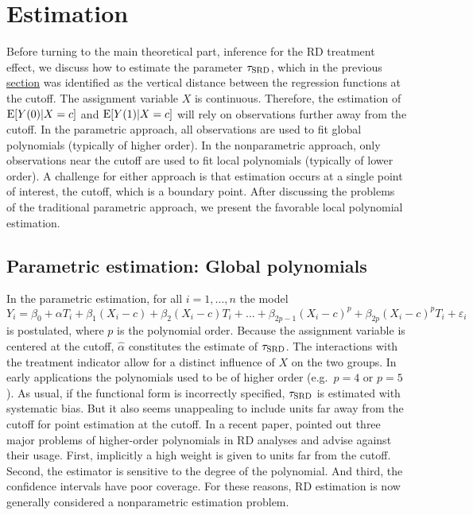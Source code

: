 


\section{Estimation} \label{sec:estimation}

Before turning to the main theoretical part, inference for the RD treatment effect, we discuss how to estimate the parameter $\tau_{\textup{SRD}}$,
which in the previous \hyperref[sec:identification]{section} was identified as the vertical distance between the regression functions at the cutoff.
The assignment variable $X$ is continuous.
Therefore, the estimation of $\operatorname{E}[Y(0) | X = c]$ and ${\operatorname{E}[Y(1) | X = c]}$ will rely on observations further away from the cutoff.
In the parametric approach, all observations are used to fit global polynomials (typically of higher order).
In the nonparametric approach, only observations near the cutoff are used to fit local polynomials (typically of lower order).
A challenge for either approach is that estimation occurs at a single point of interest, the cutoff, which is a boundary point.
After discussing the problems of the traditional parametric approach, we present the favorable local polynomial estimation.

\subsection{Parametric estimation: Global polynomials}

In the parametric estimation, for all $i = 1, \dots, n$ the model
\begin{equation}
	Y_i = \beta_0 + \alpha T_i + \beta_1(X_i-c) + \beta_2(X_i-c) T_i + \dots + \beta_{2p-1}(X_i-c)^p + \beta_{2p}(X_i-c)^p T_i + \varepsilon_i
\end{equation}
is postulated, where $p$ is the polynomial order.
Because the assignment variable is centered at the cutoff, $\hat{\alpha}$ constitutes the estimate of $\tau_{\textup{SRD}}$.
The interactions with the treatment indicator allow for a distinct influence of $X$ on the two groups.
In early applications the polynomials used to be of higher order (e.g.\ $p=4$ or $p=5$).
As usual, if the functional form is incorrectly specified, $\tau_{\textup{SRD}}$ is estimated with systematic bias.
But it also seems unappealing to include units far away from the cutoff for point estimation at the cutoff.
In a recent paper, \textcite{Gelman_2019} pointed out three major problems of higher-order polynomials in RD analyses and advise against their usage.
First, implicitly a high weight is given to units far from the cutoff.
Second, the estimator is sensitive to the degree of the polynomial.
And third, the confidence intervals have poor coverage.
For these reasons, RD estimation is now generally considered a nonparametric estimation problem.

